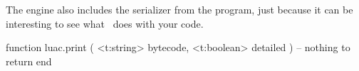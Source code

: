 \stopsubsection

\startsubsection[title=Tracing]

The engine also includes the serializer from the  program, just
because it can be interesting to see what \LUA\ does with your code.

\starttyping[option=LUA]
function luac.print ( <t:string> bytecode, <t:boolean> detailed )
    -- nothing to return
end
\stoptyping

\stopsubsection

%
%
%
%
%
%
%

\stopsection

\stopdocument

